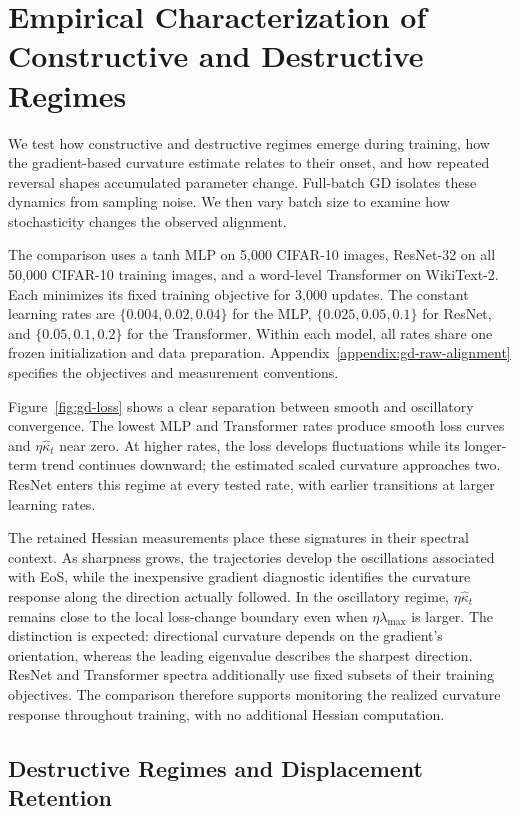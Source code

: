 \section{Empirical Characterization of Constructive and Destructive Regimes}
\label{sec:gd-experiments}

We test how constructive and destructive regimes emerge during training,
how the gradient-based curvature estimate relates to their onset, and
how repeated reversal shapes accumulated parameter change. Full-batch
GD isolates these dynamics from sampling noise. We then vary batch size
to examine how stochasticity changes the observed alignment.

The comparison uses a tanh MLP on 5,000 CIFAR-10 images, ResNet-32 on all
50,000 CIFAR-10 training images, and a word-level Transformer on WikiText-2.
Each minimizes its fixed training objective for 3,000 updates.
The constant learning rates are $\{0.004,0.02,0.04\}$ for the MLP,
$\{0.025,0.05,0.1\}$ for ResNet, and $\{0.05,0.1,0.2\}$ for the Transformer.
Within each model, all rates share one frozen initialization and data
preparation.
Appendix~\ref{appendix:gd-raw-alignment} specifies the objectives and
measurement conventions.

Figure~\ref{fig:gd-loss} shows a clear separation between smooth and
oscillatory convergence. The lowest MLP and Transformer rates produce
smooth loss curves and $\eta\widehat\kappa_t$ near zero. At higher rates,
the loss develops fluctuations while its longer-term trend continues
downward; the estimated scaled curvature approaches two. ResNet enters
this regime at every tested rate, with earlier transitions at larger
learning rates.

The retained Hessian measurements place these signatures in their
spectral context. As sharpness grows, the trajectories develop the
oscillations associated with EoS, while the inexpensive gradient
diagnostic identifies the curvature response along the direction
actually followed. In the oscillatory regime, $\eta\widehat\kappa_t$
remains close to the local loss-change boundary even when
$\eta\lambda_{\max}$ is larger. The distinction is expected: directional
curvature depends on the gradient's orientation, whereas the leading
eigenvalue describes the sharpest direction. ResNet and Transformer
spectra additionally use fixed subsets of their training objectives.
The comparison therefore supports monitoring the realized curvature
response throughout training, with no additional Hessian computation.

\subsection{Destructive Regimes and Displacement Retention}

